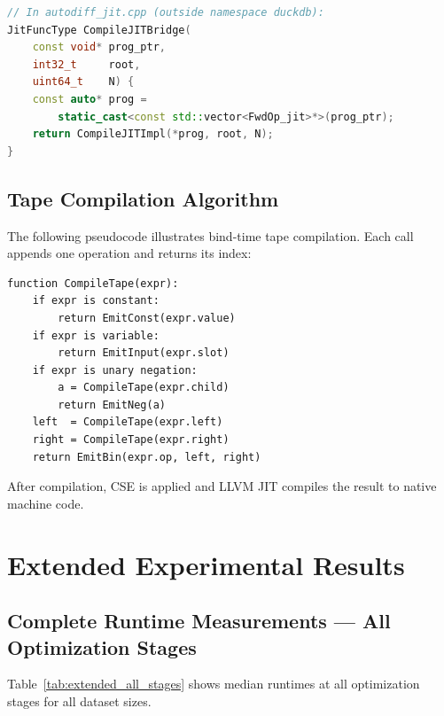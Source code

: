 \documentclass[12pt]{report}
\begin{document}
\begin{lstlisting}[language=C++]
// In autodiff_jit.cpp (outside namespace duckdb):
JitFuncType CompileJITBridge(
    const void* prog_ptr,
    int32_t     root,
    uint64_t    N) {
    const auto* prog =
        static_cast<const std::vector<FwdOp_jit>*>(prog_ptr);
    return CompileJITImpl(*prog, root, N);
}
\end{lstlisting}

\section{Tape Compilation Algorithm}

The following pseudocode illustrates bind-time tape compilation. Each
call appends one operation and returns its index:

\begin{lstlisting}[numbers=none]
function CompileTape(expr):
    if expr is constant:
        return EmitConst(expr.value)
    if expr is variable:
        return EmitInput(expr.slot)
    if expr is unary negation:
        a = CompileTape(expr.child)
        return EmitNeg(a)
    left  = CompileTape(expr.left)
    right = CompileTape(expr.right)
    return EmitBin(expr.op, left, right)
\end{lstlisting}

After compilation, CSE is applied and LLVM JIT compiles the result
to native machine code.


\chapter{Extended Experimental Results}
\label{app:experiments}

\section{Complete Runtime Measurements — All Optimization Stages}

Table~\ref{tab:extended_all_stages} shows median runtimes at all
optimization stages for all dataset sizes.
\end{document}
